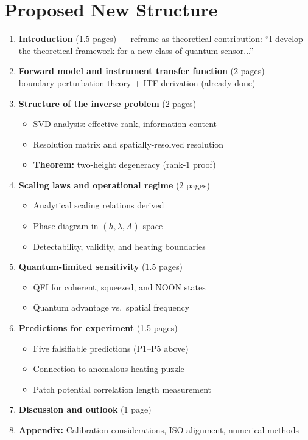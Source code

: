 \documentclass[11pt,a4paper]{article}
\begin{document}
\section{Proposed New Structure}

\begin{enumerate}
    \item \textbf{Introduction} (1.5 pages) --- reframe as theoretical
          contribution: ``I develop the theoretical framework for a new
          class of quantum sensor...''
    \item \textbf{Forward model and instrument transfer function} (2 pages)
          --- boundary perturbation theory + ITF derivation (already done)
    \item \textbf{Structure of the inverse problem} (2 pages)
          \begin{itemize}
              \item SVD analysis: effective rank, information content
              \item Resolution matrix and spatially-resolved resolution
              \item \textbf{Theorem:} two-height degeneracy (rank-1 proof)
          \end{itemize}
    \item \textbf{Scaling laws and operational regime} (2 pages)
          \begin{itemize}
              \item Analytical scaling relations derived
              \item Phase diagram in $(h, \lambda, A)$ space
              \item Detectability, validity, and heating boundaries
          \end{itemize}
    \item \textbf{Quantum-limited sensitivity} (1.5 pages)
          \begin{itemize}
              \item QFI for coherent, squeezed, and NOON states
              \item Quantum advantage vs.\ spatial frequency
          \end{itemize}
    \item \textbf{Predictions for experiment} (1.5 pages)
          \begin{itemize}
              \item Five falsifiable predictions (P1--P5 above)
              \item Connection to anomalous heating puzzle
              \item Patch potential correlation length measurement
          \end{itemize}
    \item \textbf{Discussion and outlook} (1 page)
    \item \textbf{Appendix:} Calibration considerations, ISO alignment,
          numerical methods
\end{enumerate}
\end{document}
